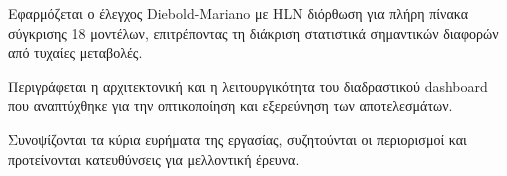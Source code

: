 \begin{description}[leftmargin=0pt, style=nextline]
    \item[\textbf{Κεφάλαιο~\ref{ch:dm} — Στατιστικοί Έλεγχοι:}]
    Εφαρμόζεται ο έλεγχος Diebold-Mariano με HLN διόρθωση για πλήρη πίνακα
    σύγκρισης 18 μοντέλων, επιτρέποντας τη διάκριση στατιστικά σημαντικών
    διαφορών από τυχαίες μεταβολές.

    \item[\textbf{Κεφάλαιο~\ref{ch:dashboard} — Σύστημα Οπτικοποίησης:}]
    Περιγράφεται η αρχιτεκτονική και η λειτουργικότητα του διαδραστικού dashboard
    που αναπτύχθηκε για την οπτικοποίηση και εξερεύνηση των αποτελεσμάτων.

    \item[\textbf{Κεφάλαιο~\ref{ch:conclusions} — Συμπεράσματα:}]
    Συνοψίζονται τα κύρια ευρήματα της εργασίας, συζητούνται οι περιορισμοί και
    προτείνονται κατευθύνσεις για μελλοντική έρευνα.
\end{description}
